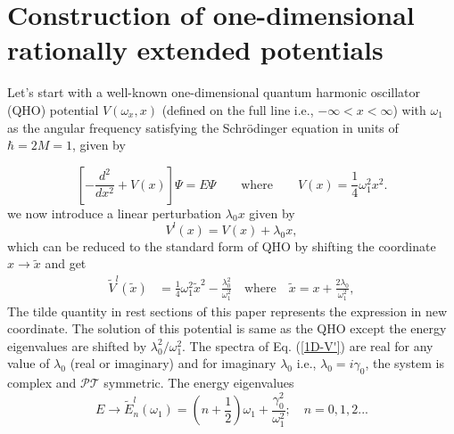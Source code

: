\documentclass[a4paper, 12pt]{article}
\newcommand{\td}[1]{\tilde{#1}}
\begin{document}
\section{Construction of one-dimensional rationally extended potentials}
Let's start with a well-known one-dimensional quantum harmonic oscillator (QHO) potential $V(\omega_x,x)$ (defined on the full line i.e., $-\infty<x<\infty$) with \( \omega_1 \) as the angular frequency satisfying the Schr\"odinger equation in units of \(\hbar = 2M = 1\), given by

\begin{equation}\label{1D-SE}
\left[-\frac{d^2 }{dx^2} +V(x) \right] \Psi = E \Psi\qquad\mbox{where}\qquad V(x)=\frac{1}{4}\omega_1^2 x^2.
\end{equation}
we now introduce a linear perturbation \( \lambda_0 x\) given by
\begin{equation}\label{1D-V-I}
V^{l}(x) =V(x) + \lambda_0 x ,
\end{equation}
which can be reduced to the standard form of QHO \cite{greiner2001quantum} by shifting the coordinate $x\rightarrow \td{x}$ and get
\begin{align}\label{1D-V'}
\td{V}^l(\td{x}) &= \frac{1}{4}\omega_1^2 \td{x}^2 - \frac{\lambda_0^2}{\omega_1^2}\quad\mbox{where}\quad \td{x} = x + \frac{2\lambda_0}{ \omega_1^2},
\end{align}
The tilde quantity in rest sections of this paper represents the expression in new coordinate. 
The solution of this potential is same as the QHO except the energy eigenvalues are shifted by \(\lambda_0^2/\omega_1^2\). The spectra of Eq. (\ref{1D-V'}) are real for any value of \( \lambda_0 \) (real or imaginary) and for imaginary $\lambda_0$ i.e., \( \lambda_0=i\gamma_0 \), the system is complex and $\mathcal{PT}$ symmetric. The energy eigenvalues
\begin{equation}
	E\rightarrow \tilde{E}_n^l(\omega_1)=\left(n+\frac{1}{2}\right) \omega_1+\frac{\gamma^2_0}{\omega^2_1};\quad n=0,1,2...
\end{equation} 
\end{document}
